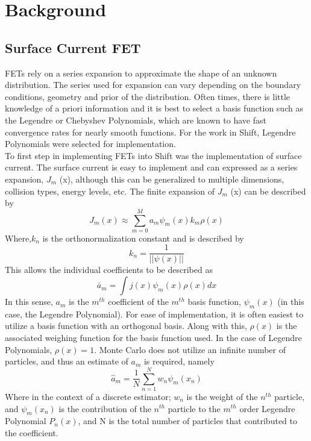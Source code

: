 \documentclass[10tma4paper]{article}
\begin{document}
\section{Background}\label{background}

\subsection{Surface Current FET}\label{Surface Current FET}

FETs rely on a series expansion to approximate the shape of an unknown distribution. The series used for expansion can vary depending on the boundary conditions, geometry and prior of the distribution. Often times, there is little knowledge of a priori information and it is best to select a basis function such as the Legendre or Chebyshev Polynomials, which are known to have fast convergence rates for nearly smooth functions. For the work in Shift, Legendre Polynomials were selected for implementation.
\\
To first step in implementing FETs into Shift was the implementation of surface current. The surface current is easy to implement and can expressed as a series expansion, $J_{m}$ (x), although this can be generalized to multiple dimensions, collision types, energy levels, etc. The finite expansion of $J_{m}$ (x) can be described by
	\begin{equation} \label{eq:current approx}
	J_{m}(x) \approx \sum_{m=0}^{M}a_{m}\psi_{m}(x)k_{m}\rho(x)
	\end{equation}
Where,$k_{n}$ is the orthonormalization constant and is described by
\begin{equation}\label{eq:ortho const}
k_{n} = \frac{1}{||\psi(x)||}
\end{equation} 
This allows the individual coefficients to be described as
	 \begin{equation} \label{eq:a bar m}
	\bar{a}_{m}=\int j(x)\psi_{m}(x)\rho(x)dx
	 \end{equation}
In this sense, $a_m$ is the $m^{th}$ coefficient of the $m^{th}$ basis function, $\psi_{m}(x)$ (in this case, the Legendre Polynomial). For ease of implementation, it is often easiest to utilize a basis function with an orthogonal basis. Along with this, $\rho(x)$ is the associated weighing function for the basis function used. In the case of Legendre Polynomials, $\rho(x)=1$. Monte Carlo does not utilize an infinite number of particles, and thus an estimate of $a_{m}$ is required, namely
	 \begin{equation} \label{eq:a hat m}
	 \hat{a}_{m}=\frac{1}{N}\sum_{n=1}^{N}w_{n}\psi_{m}(x_{n})
	 \end{equation}
Where in the context of a discrete estimator; $w_{n}$ is the weight of the $n^{th}$ particle, and $\psi_{m}(x_{n})$ is the contribution of the $n^{th}$ particle to the $m^{th}$ order Legendre Polynomial $P_{n}(x)$, and N is the total number of particles that contributed to the coefficient. 
\end{document}
